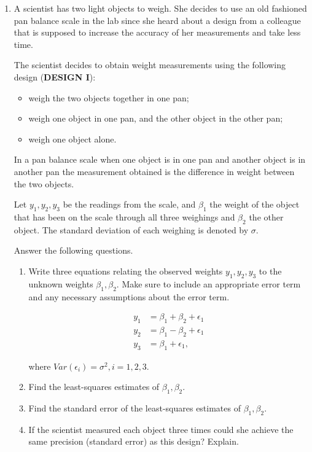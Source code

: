 \documentclass[11pt, oneside]{article}   	%
\begin{document}
\begin{enumerate}

\item A scientist has two light objects to weigh.  She decides to use an old fashioned pan balance scale in the lab since she heard about a design from a colleague that is supposed to increase the accuracy of her measurements and take less time.  

The scientist decides to obtain weight measurements using the following design ({\bf{DESIGN I}}):

\begin{itemize}
\item weigh the two objects together in one pan;
\item weigh one object in one pan, and the other object in the other pan;
\item weigh one object alone.
\end{itemize}

In a pan balance scale when one object is in one pan and another object is in another pan the measurement obtained is the difference in weight between the two objects.

Let $y_1,y_2,y_3$ be the readings from the scale, and $\beta_1$ the weight of the object that has been on the scale through all three weighings and $\beta_2$ the other object. The standard deviation of each weighing is denoted by  $\sigma$.  

Answer the following questions.

\begin{enumerate}

\item Write three equations relating the observed weights $y_1,y_2,y_3$ to the unknown weights $\beta_1,\beta_2$.  Make sure to include an appropriate error term and any necessary assumptions about the error term. 

\begin{align*}
y_1 &= \beta_1+\beta_2+\epsilon_1 \\
y_2 &= \beta_1-\beta_2+\epsilon_1 \\
y_3 &= \beta_1+\epsilon_1,
\end{align*}

where $Var(\epsilon_i)=\sigma^2, i=1,2,3.$


\item Find the least-squares estimates of $\beta_1,\beta_2$.



\item Find the standard error of the least-squares estimates of $\beta_1,\beta_2$.
\item If the scientist measured each object three times could she achieve the same precision (standard error) as this design?  Explain. 


\end{enumerate}
\end{enumerate}
\end{document}
